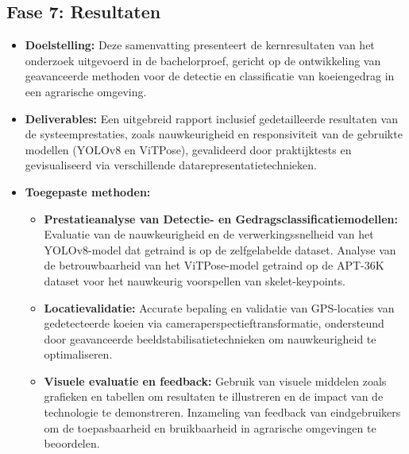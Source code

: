 \subsection{Fase 7: Resultaten}
\begin{itemize}
\item \textbf{Doelstelling:} Deze samenvatting presenteert de kernresultaten van het onderzoek uitgevoerd in de bachelorproef, gericht op de ontwikkeling van geavanceerde methoden voor de detectie en classificatie van koeiengedrag in een agrarische omgeving.

\item \textbf{Deliverables:} Een uitgebreid rapport inclusief gedetailleerde resultaten van de systeemprestaties, zoals nauwkeurigheid en responsiviteit van de gebruikte modellen (YOLOv8 en ViTPose), gevalideerd door praktijktests en gevisualiseerd via verschillende datarepresentatietechnieken.

\item \textbf{Toegepaste methoden:}
    \begin{itemize}
        \item \textbf{Prestatieanalyse van Detectie- en Gedragsclassificatiemodellen:} Evaluatie van de nauwkeurigheid en de verwerkingssnelheid van het YOLOv8-model dat getraind is op de zelfgelabelde dataset. Analyse van de betrouwbaarheid van het ViTPose-model getraind op de APT-36K dataset voor het nauwkeurig voorspellen van skelet-keypoints.
        \item \textbf{Locatievalidatie:} Accurate bepaling en validatie van GPS-locaties van gedetecteerde koeien via cameraperspectieftransformatie, ondersteund door geavanceerde beeldstabilisatietechnieken om nauwkeurigheid te optimaliseren.
        \item \textbf{Visuele evaluatie en feedback:} Gebruik van visuele middelen zoals grafieken en tabellen om resultaten te illustreren en de impact van de technologie te demonstreren. Inzameling van feedback van eindgebruikers om de toepasbaarheid en bruikbaarheid in agrarische omgevingen te beoordelen.
    \end{itemize}
\end{itemize}

